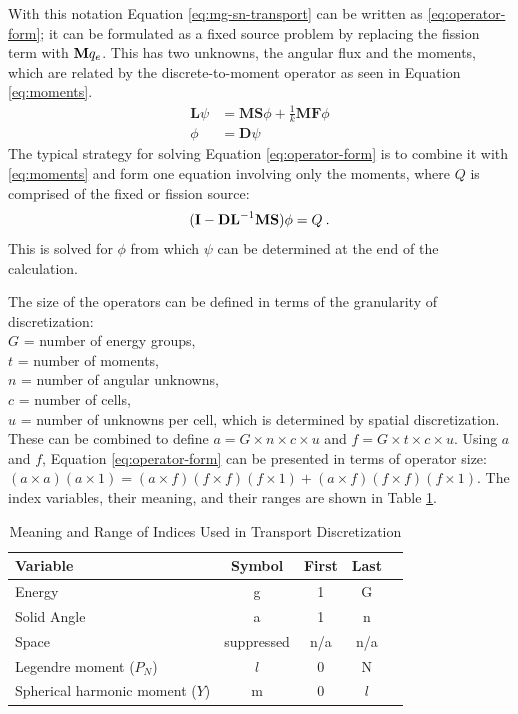 With this notation Equation \eqref{eq:mg-sn-transport} can be written as \eqref{eq:operator-form}; it can be formulated as a fixed source problem by replacing the fission term with $\mathbf{M}q_{e}$. This has two unknowns, the angular flux and the moments, which are related by the discrete-to-moment operator as seen in Equation \eqref{eq:moments}.
%
\begin{align}
  \mathbf{L} \psi &= \mathbf{MS}\phi + \frac{1}{k}\mathbf{MF}\phi \label{eq:operator-form}\\
  \phi &= \mathbf{D}\psi 
  \label{eq:moments}
\end{align}
The typical strategy for solving Equation \eqref{eq:operator-form} is to combine it with \eqref{eq:moments} and form one equation involving only the moments, where $Q$ is comprised of the fixed or fission source: 
\begin{equation}
   (\mathbf{I} - \mathbf{DL}^{-1}\mathbf{MS})\phi = Q \:.
\end{equation}  
This is solved for $\phi$ from which $\psi$ can be determined at the end of the calculation.

The size of the operators can be defined in terms of the granularity of discretization: \\
%
\indent $G$ = number of energy groups, \\
\indent $t$ = number of moments, \\
\indent $n$ = number of angular unknowns, \\
\indent $c$ = number of cells, \\
\indent $u$ = number of unknowns per cell, which is determined by spatial discretization. \\
%
These can be combined to define $a = G \times n \times c \times u$ and $f = G \times t \times c \times u$. Using $a$ and $f$, Equation \eqref{eq:operator-form} can be presented in terms of operator size: $(a \times a)(a \times 1) = (a \times f) (f \times f) (f \times 1) + (a \times f) (f \times f) (f \times 1)$. The index variables, their meaning, and their ranges are shown in Table \ref{table:index}. 
%
\begin{table}[!h]
\caption{Meaning and Range of Indices Used in Transport Discretization}
\begin{center}
\begin{tabular}{l c c c c}
\hline
Variable & Symbol & First & Last \\[0.5ex]
\hline
Energy & g & 1 & G \\
Solid Angle & a & 1 & n \\
Space & suppressed & n/a & n/a \\
Legendre moment ($P_{N}$) & $l$ & 0 & N \\
Spherical harmonic moment ($Y$) & m & 0 & $l$ \\
\hline
\end{tabular}
\end{center}
\label{table:index}
\end{table}
%

